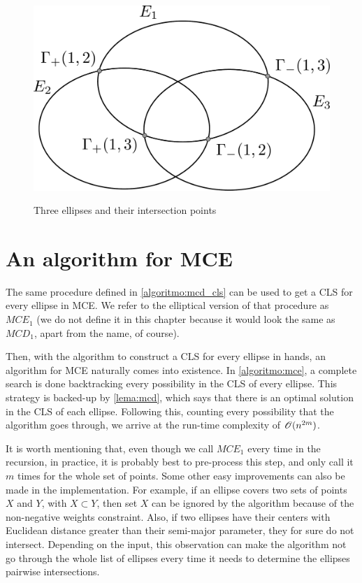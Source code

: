 \begin{figure}[H]
\centering
    \caption{Three ellipses and their intersection points}
    \includegraphics[scale=.32]{tex/figures/3ellipses_intersect.pdf}
    \fautor
    \label{fig:3ellipses_intersect}
\end{figure}
\section{An algorithm for MCE}

The same procedure defined in \autoref{algoritmo:mcd_cls} can be used to get a CLS for every ellipse in MCE. We refer to the elliptical version of that procedure as $MCE_1$ (we do not define it in this chapter because it would look the same as $MCD_1$, apart from the name, of course). 

Then, with the algorithm to construct a CLS for every ellipse in hands, an algorithm for MCE naturally comes into existence. In \autoref{algoritmo:mce}, a complete search is done backtracking every possibility in the CLS of every ellipse. This strategy is backed-up by \autoref{lema:mcd}, which says that there is an optimal solution in the CLS of each ellipse. 
Following this, counting every possibility that the algorithm goes through, we arrive at the run-time complexity of $\mathscr{O}(n^{2m})$.

It is worth mentioning that, even though we call $MCE_1$ every time in the recursion, in practice, it is probably best to pre-process this step, and only call it $m$ times for the whole set of points.
Some other easy improvements can also be made in the implementation. For example, if an ellipse covers two sets of points $X$ and $Y$, with $X \subset Y$, then set $X$ can be ignored by the algorithm because of the non-negative weights constraint. Also, if two ellipses have their centers with Euclidean distance greater than their semi-major parameter, they for sure do not intersect. Depending on the input, this observation can make the algorithm not go through the whole list of ellipses every time it needs to determine the ellipses pairwise intersections.

